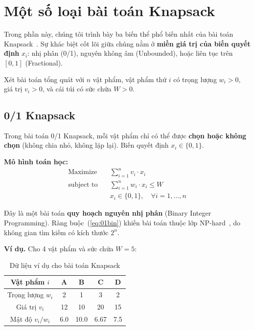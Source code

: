 \section{Một số loại bài toán Knapsack}
\label{sec:knapsack_intro}

Trong phần này, chúng tôi trình bày ba biến thể phổ biến nhất của bài toán Knapsack~\cite{kellerer2004knapsack}. Sự khác biệt cốt lõi giữa chúng nằm ở \textbf{miền giá trị của biến quyết định} $x_i$: nhị phân (0/1), nguyên không âm (Unbounded), hoặc liên tục trên $[0,1]$ (Fractional).

Xét bài toán tổng quát với $n$ vật phẩm, vật phẩm thứ $i$ có trọng lượng $w_i > 0$, giá trị $v_i > 0$, và cái túi có sức chứa $W > 0$.

\subsection{0/1 Knapsack}

Trong bài toán 0/1 Knapsack, mỗi vật phẩm chỉ có thể được \textbf{chọn hoặc không chọn} (không chia nhỏ, không lặp lại). Biến quyết định $x_i \in \{0, 1\}$.

\textbf{Mô hình toán học:}
\begin{align}
    \text{Maximize} \quad & \sum_{i=1}^{n} v_i \cdot x_i \label{eq:01obj} \\
    \text{subject to} \quad & \sum_{i=1}^{n} w_i \cdot x_i \leq W \label{eq:01cap} \\
    & x_i \in \{0, 1\}, \quad \forall i = 1, \ldots, n \label{eq:01bin}
\end{align}

Đây là một bài toán \textbf{quy hoạch nguyên nhị phân} (Binary Integer Programming). Ràng buộc~(\ref{eq:01bin}) khiến bài toán thuộc lớp NP-hard~\cite{karp1972reducibility}, do không gian tìm kiếm có kích thước $2^n$.

\textbf{Ví dụ.} Cho 4 vật phẩm và sức chứa $W = 5$:

\begin{table}[H]
\centering
\begin{tabular}{c|cccc}
\toprule
Vật phẩm $i$ & A & B & C & D \\
\midrule
Trọng lượng $w_i$ & 2 & 1 & 3 & 2 \\
Giá trị $v_i$ & 12 & 10 & 20 & 15 \\
Mật độ $v_i/w_i$ & 6.0 & 10.0 & 6.67 & 7.5 \\
\bottomrule
\end{tabular}
\caption{Dữ liệu ví dụ cho bài toán Knapsack}
\label{tab:example_items}
\end{table}

